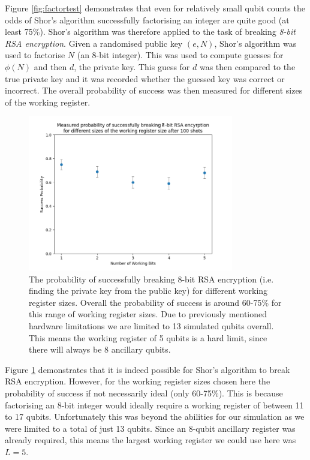\documentclass{article}[11pt]
\begin{document}
Figure \ref{fig:factortest} demonstrates that even for relatively small qubit counts the odds of Shor's algorithm successfully factorising an integer are quite good (at least 75\%). Shor's algorithm was therefore applied to the task of breaking \emph{8-bit RSA encryption}. Given a randomised public key $(e,N)$, Shor's algorithm was used to factorise $N$ (an 8-bit integer). This was used to compute guesses for $\phi(N)$ and then $d$, the private key. This guess for $d$ was then compared to the true private key and it was recorded whether the guessed key was correct or incorrect. The overall probability of success was then measured for different sizes of the working register.

\begin{figure}[H]
    \centering
    \includegraphics[width=0.8\textwidth]{Pictures/RSA Breaking/rsa_cracking_alt.png}
    \caption{The probability of successfully breaking 8-bit RSA encryption (i.e. finding the private key from the public key) for different working register sizes. Overall the probability of success is around 60-75\% for this range of working register sizes. Due to previously mentioned hardware limitations we are limited to 13 simulated qubits overall. This means the working register of 5 qubits is a hard limit, since there will always be 8 ancillary qubits.}
    \label{fig:RSA_cracking}
\end{figure}

Figure \ref{fig:RSA_cracking} demonstrates that it is indeed possible for Shor's algorithm to break RSA encryption. However, for the working register sizes chosen here the probability of success if not necessarily ideal (only 60-75\%). This is because factorising an 8-bit integer would ideally require a working register of between 11 to 17 qubits.\cite{candela,shorcircuit} Unfortunately this was beyond the abilities for our simulation as we were limited to a total of just 13 qubits. Since an 8-qubit ancillary register was already required, this means the largest working register we could use here was $L=5$.
\end{document}
